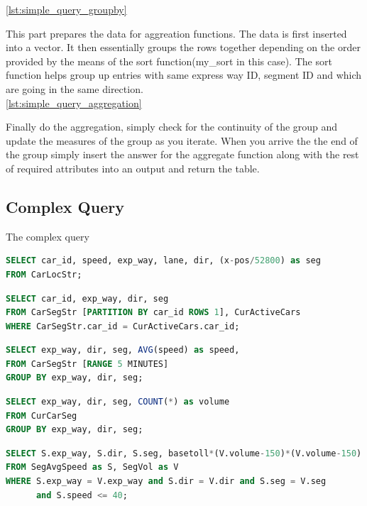 \ref{lst:simple_query_groupby}
\par This part prepares the data for aggreation functions. The data is first inserted into a vector. It then essentially groups the rows together depending on the order provided by the means of the sort function(my\_sort in this case). The sort function helps group up entries with same express way ID, segment ID and which are going in the same direction.\\
\ref{lst:simple_query_aggregation}
\par Finally do the aggregation, simply check for the continuity of the group and update the measures of the group as you iterate. When you arrive the the end of the group simply insert the answer for the aggregate function along with the rest of required attributes into an output and return the table.
\subsection{Complex Query}
The complex query\cite{linearroad_queries}
\begin{lstlisting}[language=SQL, caption=CarSegStr]
SELECT car_id, speed, exp_way, lane, dir, (x-pos/52800) as seg
FROM CarLocStr;
\end{lstlisting}

\begin{lstlisting}[language=SQL, caption=CurCarSeg]
SELECT car_id, exp_way, dir, seg
FROM CarSegStr [PARTITION BY car_id ROWS 1], CurActiveCars
WHERE CarSegStr.car_id = CurActiveCars.car_id;
\end{lstlisting}

\begin{lstlisting}[language=SQL, caption=SegAvgSpeed]
SELECT exp_way, dir, seg, AVG(speed) as speed,
FROM CarSegStr [RANGE 5 MINUTES]
GROUP BY exp_way, dir, seg;
\end{lstlisting}
\begin{lstlisting}[language=SQL, caption=SegVol]
SELECT exp_way, dir, seg, COUNT(*) as volume
FROM CurCarSeg
GROUP BY exp_way, dir, seg;
\end{lstlisting}
\begin{lstlisting}[language=SQL, caption=SegToll]
SELECT S.exp_way, S.dir, S.seg, basetoll*(V.volume-150)*(V.volume-150)
FROM SegAvgSpeed as S, SegVol as V
WHERE S.exp_way = V.exp_way and S.dir = V.dir and S.seg = V.seg
      and S.speed <= 40;
\end{lstlisting}

